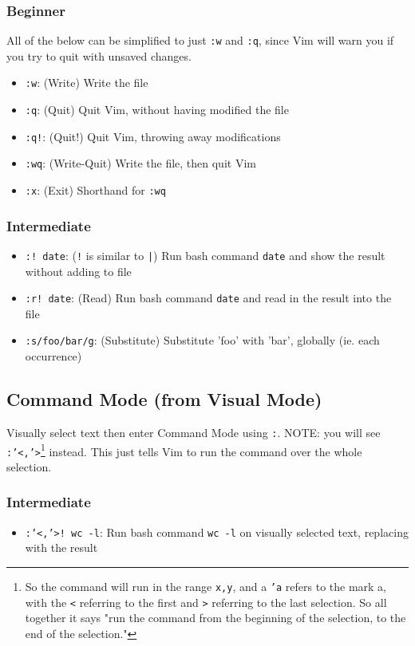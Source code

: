 \documentclass[11pt]{article}
\begin{document}
\subsubsection{Beginner}
\label{sec:orgf12f52b}
All of the below can be simplified to just \texttt{:w} and \texttt{:q}, since Vim will warn
you if you try to quit with unsaved changes.

\begin{itemize}
\item \texttt{:w}: (Write) Write the file
\item \texttt{:q}: (Quit) Quit Vim, without having modified the file
\item \texttt{:q!}: (Quit!) Quit Vim, throwing away modifications
\item \texttt{:wq}: (Write-Quit) Write the file, then quit Vim
\item \texttt{:x}: (Exit) Shorthand for \texttt{:wq}
\end{itemize}
\subsubsection{Intermediate}
\label{sec:org780432f}
\begin{itemize}
\item \texttt{:! date}: (\texttt{!} is similar to \texttt{|}) Run bash command \texttt{date} and show the result without adding to file
\item \texttt{:r! date}: (Read) Run bash command \texttt{date} and read in the result into the file
\item \texttt{:s/foo/bar/g}: (Substitute) Substitute 'foo' with 'bar', globally (ie. each occurrence)
\end{itemize}
\subsection{Command Mode (from Visual Mode)}
\label{sec:orgb7ddbb4}
Visually select text then enter Command Mode using \texttt{:}. NOTE: you will see
\texttt{:'<,'>}\footnote{So the command will run in the range \texttt{x,y}, and 
a \texttt{'a} refers to the mark a, with the \texttt{<} referring to the first and \texttt{>}
referring to the last selection. So all together it says "run the command from
the beginning of the selection, to the end of the selection."} instead. This just tells Vim to run the command over the whole
selection.
\subsubsection{Intermediate}
\label{sec:orgd22a223}
\begin{itemize}
\item \texttt{:'<,'>! wc -l}: Run bash command \texttt{wc -l} on visually selected text, replacing with the result
\end{itemize}
\end{document}
